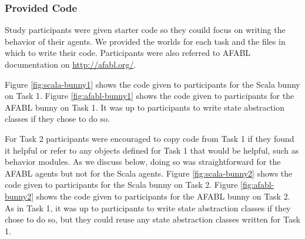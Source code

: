 






\subsubsection{Provided Code}

Study participants were given starter code so they couild focus on writing the behavior of their agents. We provided the worlds for each task and the files in which to write their code. Participants were also referred to AFABL documentation on \href{http://afabl.org/}{http://afabl.org/}.

Figure \ref{fig:scala-bunny1} shows the code given to participants for the Scala bunny on Task 1. Figure \ref{fig:afabl-bunny1} shows the code given to participants for the AFABL bunny on Task 1. It was up to participants to write state abstraction classes if they chose to do so.

For Task 2 participants were encouraged to copy code from Task 1 if they found it helpful or refer to any objects defined for Task 1 that would be helpful, such as behavior modules. As we discuss below, doing so was straightforward for the AFABL agents but not for the Scala agents. Figure \ref{fig:scala-bunny2} shows the code given to participants for the Scala bunny on Task 2. Figure \ref{fig:afabl-bunny2} shows the code given to participants for the AFABL bunny on Task 2. As in Task 1, it was up to participants to write state abstraction classes if they chose to do so, but they could reuse any state abstraction classes written for Task 1.

